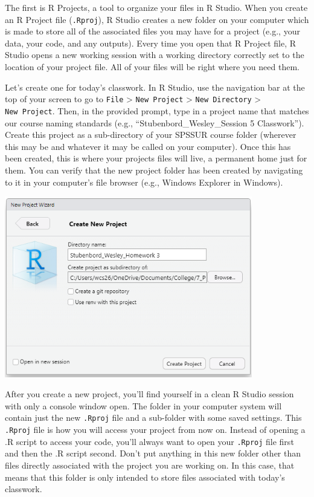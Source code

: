 \documentclass[
  letterpaper,
]{book}
\begin{document}
The first is R Projects, a tool to organize your files in R Studio. When
you create an R Project file (\texttt{.Rproj}), R Studio creates a new
folder on your computer which is made to store all of the associated
files you may have for a project (e.g., your data, your code, and any
outputs). Every time you open that R Project file, R Studio opens a new
working session with a working directory correctly set to the location
of your project file. All of your files will be right where you need
them.

Let's create one for today's classwork. In R Studio, use the navigation
bar at the top of your screen to go to \texttt{File} \textgreater{}
\texttt{New\ Project} \textgreater{} \texttt{New\ Directory}
\textgreater{} \texttt{New\ Project}. Then, in the provided prompt, type
in a project name that matches our course naming standards (e.g.,
``Stubenbord\_Wesley\_Session 5 Classwork''). Create this project as a
sub-directory of your SPSSUR course folder (wherever this may be and
whatever it may be called on your computer). Once this has been created,
this is where your projects files will live, a permanent home just for
them. You can verify that the new project folder has been created by
navigating to it in your computer's file browser (e.g., Windows Explorer
in Windows).

\includegraphics[width=4.26042in,height=\textheight]{images/Creating-R-Project.PNG}

After you create a new project, you'll find yourself in a clean R Studio
session with only a console window open. The folder in your computer
system will contain just the new \texttt{.Rproj} file and a sub-folder
with some saved settings. This \texttt{.Rproj} file is how you will
access your project from now on. Instead of opening a .R script to
access your code, you'll always want to open your \texttt{.Rproj} file
first and then the .R script second. Don't put anything in this new
folder other than files directly associated with the project you are
working on. In this case, that means that this folder is only intended
to store files associated with today's classwork.
\end{document}
